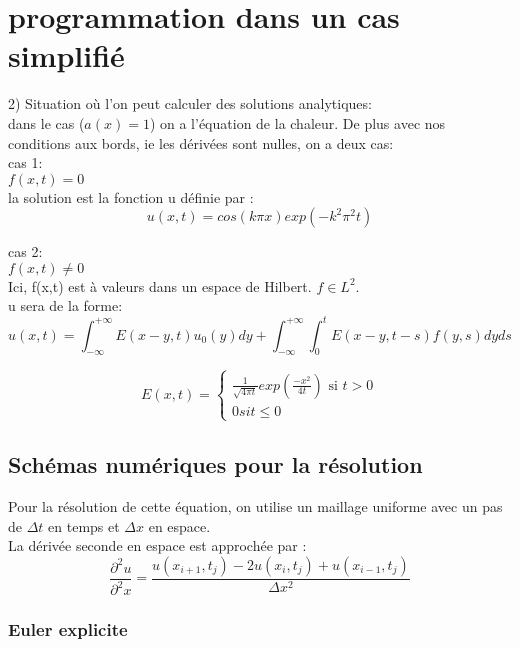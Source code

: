 \documentclass[a4paper,12pt,twoside]{report}
\begin{document}
\chapter{programmation dans un cas simplifié} 

2) Situation où l'on peut calculer des solutions analytiques: \\
dans le cas ($a(x) = 1$) on a l'équation de la chaleur. De plus avec nos conditions aux bords, ie les dérivées sont nulles, on a deux cas: \\
 


cas 1:\\ 
$f(x,t) = 0$ \\
la solution est la fonction u définie par : \\
$$ u(x,t) =  cos(k \pi x) exp(-k^2 \pi^2 t) $$ 

cas 2:\\
$f(x,t) \neq 0$ \\
Ici, f(x,t) est à valeurs dans un espace de Hilbert. $ f \in L^2 $. \\
u sera de la forme: \\
$$ u(x,t) = \int_{- \infty}^{+ \infty} E(x-y,t)u_0(y)dy + \int_{-\infty}^{+\infty} \int_{0}^{t} E(x-y,t-s)f(y,s)dyds$$

$$ 
E(x,t) = \left\{ 
	\begin{array}{ll}
		\frac{1}{\sqrt{4 \pi t}} exp(\frac{-x^2}{4t}) \mbox{ si } t>0 \\
		 0 si t \leq 0  
	\end{array}
\right. 
$$

\section{Schémas numériques pour la résolution}

Pour la résolution de cette équation, on utilise un maillage uniforme avec un pas de $\Delta t$ en temps et $\Delta x$ en espace. \\
La dérivée seconde en espace est approchée par : 
\begin{equation}
\frac{\partial ^2u}{\partial ^2x} = \frac{u(x_{i+1},t_j) - 2u(x_i,t_j) + u(x_{i-1},t_j)}{\Delta x^2}
\end{equation}

\subsection{Euler explicite}
\end{document}
